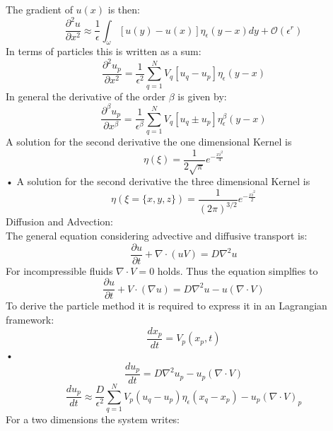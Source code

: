 \documentclass[hyperref]{labbook}
\numberwithin{equation}{experiment}
\numberwithin{table}{experiment}
\numberwithin{figure}{experiment}
\begin{document}
The gradient of $u(x)$ is then:
\begin{equation}
\frac{\partial^2 u}{\partial x^2}  \approx \frac{1}{\epsilon} \int_\omega [u(y) - u(x)] \eta_\epsilon(y-x) dy + \mathcal{O}(\epsilon^r)
\end{equation}
In terms of particles this is written as a sum: 
\begin{equation}
\frac{\partial^2 u_p}{\partial x^2}  = \frac{1}{\epsilon^2} \sum_{q=1}^N V_q [u_q - u_p] \eta_\epsilon(y-x) 
\end{equation}
In general the derivative of the order $\beta$ is given by:
\begin{equation}
\frac{\partial^\beta u_p}{\partial x^\beta}  = \frac{1}{\epsilon^\beta} \sum_{q=1}^N V_q [u_q \pm u_p] \eta^\beta_\epsilon(y-x) 
\end{equation}
A solution for the second derivative the one dimensional Kernel is 
\begin{equation}
\eta (\xi) = \frac{1}{2\sqrt{\pi}}e^{-\frac{xi^2}{4}}
\end{equation}•
A solution for the second derivative the three dimensional Kernel is 
\begin{equation}
\eta (\xi = \{x,y,z\}) = \frac{1}{(2\pi)^{3/2}}e^{-\frac{xi^2}{2}}
\end{equation}
Diffusion and Advection: \\[1em]
The general equation considering advective and diffusive transport is:
\begin{equation}
\frac{\partial u}{\partial t} + \nabla \cdot(u V) = D\nabla^2u
\end{equation}
For incompressible fluids $\nabla \cdot V = 0$ holds. Thus the equation simplfies to 
\begin{equation}
\frac{\partial u}{\partial t} + V \cdot (\nabla u) = D\nabla^2u -  u (\nabla\cdot V)
\end{equation}
To derive the particle method it is required to express it in an Lagrangian framework:
\begin{equation}
\frac{dx_p}{dt} = V_p(x_p, t )
\end{equation}•
\begin{equation}
\frac{du_p}{dt} = D\nabla^2 u_p - u_p(\nabla \cdot V) 
\end{equation}
\begin{equation}
\frac{du_p}{dt} \approx \frac{D}{\epsilon^2} \sum_{q  = 1 }^N V_p(u_q - u_p) \eta_\epsilon(x_q - x_p) - u_p(\nabla \cdot V)_p
\end{equation}
For a two dimensions the system writes: 
\end{document}

